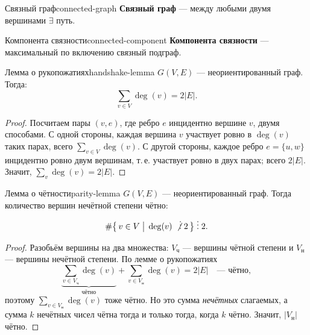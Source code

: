 \begin{defn}{Связный граф}{connected-graph}
\textbf{Связный граф} --- между любыми двумя вершинами $\exists$ путь.
\end{defn}

\begin{defn}{Компонента связности}{connected-component}
\textbf{Компонента связности} --- максимальный по включению связный подграф.
\end{defn}


\bigskip
\begin{statement}{Лемма о рукопожатиях}{handshake-lemma}
$G(V, E)$ --- неориентированный граф. Тогда:
\[
  \sum_{v \in V} \deg(v) = 2|E|.
\]
\end{statement}

\begin{proof}
Посчитаем пары $(v, e)$, где ребро $e$ инцидентно вершине $v$, двумя
способами. С одной стороны, каждая вершина $v$ участвует ровно в $\deg(v)$
таких парах, всего $\sum_{v \in V} \deg(v)$. С другой стороны, каждое ребро
$e = \{u, w\}$ инцидентно ровно двум вершинам, т.\,е. участвует ровно в двух
парах; всего $2|E|$. Значит, $\sum_{v} \deg(v) = 2|E|$.
\end{proof}

\begin{statement}{Лемма о чётности}{parity-lemma}
$G(V, E)$ --- неориентированный граф. Тогда количество вершин нечётной степени чётно:
\[
  \#\bigl\{\, v \in V \;\big|\; \deg(v) \;\not\vdots\; 2 \,\bigr\} \;\vdots\; 2.
\]
\end{statement}

\begin{proof}
Разобьём вершины на два множества: $V_{\text{ч}}$ --- вершины чётной степени
и $V_{\text{н}}$ --- вершины нечётной степени. По лемме о рукопожатиях
\[
  \underbrace{\sum_{v \in V_{\text{ч}}} \deg(v)}_{\text{чётно}}
  + \sum_{v \in V_{\text{н}}} \deg(v) = 2|E| \quad\text{--- чётно},
\]
поэтому $\sum_{v \in V_{\text{н}}} \deg(v)$ тоже чётно. Но это сумма
\emph{нечётных} слагаемых, а сумма $k$ нечётных чисел чётна тогда и только
тогда, когда $k$ чётно. Значит, $|V_{\text{н}}|$ чётно.
\end{proof}


